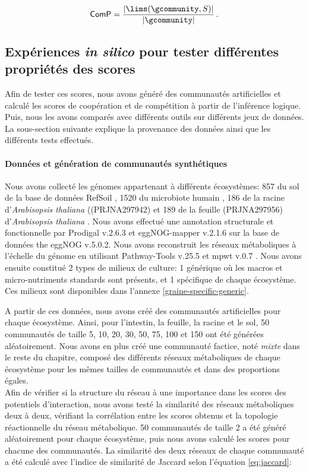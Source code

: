 \documentclass[../main.tex]{subfiles}
\begin{document}
\[
    \textsf{ComP} = \frac{\vert\lims(\gcommunity,S)\vert}{\vert \gcommunity \vert} \,.
\]


\subsection{Expériences \textit{in silico} pour tester différentes propriétés des scores}
Afin de tester ces scores, nous avons généré des communautés artificielles et calculé les scores de coopération et de compétition à partir de l'inférence logique. Puis, nous les avons comparés avec différents outils sur différents jeux de données. La sous-section suivante explique la provenance des données ainsi que les différents tests effectués.

\paragraph*{Données et génération de communautés synthétiques}
Nous avons collecté les génomes appartenant à différents écosystèmes: 857 du sol de la base de données RefSoil \cite{Choi2017}, 1520 du microbiote humain \cite{Zou2019}, 186 de la racine d'\textit{Arabisopsis thaliana} ((PRJNA297942) et 189 de la feuille (PRJNA297956) d'\textit{Arabisopsis thaliana} \cite{Bai2015}. Nous avons effectué une annotation structurale et fonctionnelle par Prodigal \cite{Hyatt2010} v.2.6.3 et eggNOG-mapper \cite{Cantalapiedra2021} v.2.1.6 sur la base de données the eggNOG \cite{Huerta-Cepas2019} v.5.0.2. Nous avons reconstruit les réseaux métaboliques à l'échelle du génome en utilisant Pathway-Tools v.25.5 \cite{Karp2022} et mpwt v.0.7 \cite{Belcour.2020}. Nous avons ensuite constitué 2 types de milieux de culture: 1 générique où les macros et micro-nutriments standards sont présents, et 1 spécifique de chaque écosystème. Ces milieux sont disponibles dans l'annexe \ref{graine-specific-generic}.

A partir de ces données, nous avons créé des communautés artificielles pour chaque écosystème. Ainsi, pour l'intestin, la feuille, la racine et le sol, 50 communautés de taille 5, 10, 20, 30, 50, 75, 100 et 150 ont été générées aléatoirement. Nous avons en plus créé une communauté factice, noté \textit{mixte} dans le reste du chapitre, composé des différents réseaux métaboliques de chaque écosystème pour les mêmes tailles de communautés et dans des proportions égales. \\

Afin de vérifier si la structure du réseau à une importance dans les scores des potentiels d'interaction, nous avons testé la similarité des réseaux métaboliques deux à deux, vérifiant la corrélation entre les scores obtenus et la topologie réactionnelle du réseau métabolique. 50 communautés de taille 2 a été généré aléatoirement pour chaque écosystème, puis nous avons calculé les scores pour chacune des communautés. La similarité des deux réseaux de chaque communauté a été calculé avec l'indice de similarité de Jaccard selon l'équation \ref{eq:jaccard}:
\end{document}
